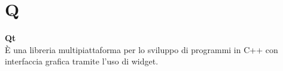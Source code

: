 \section{Q}
\textbf{Qt}\\
È una libreria multipiattaforma per lo sviluppo di programmi in C++ con interfaccia grafica tramite l'uso di widget. \\ \\
\clearpage